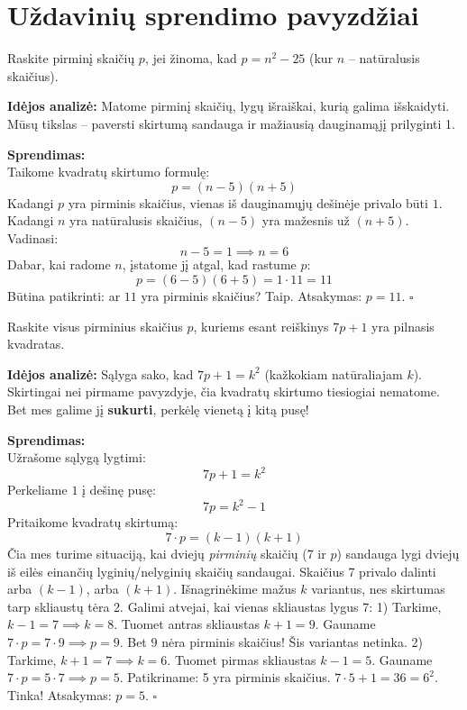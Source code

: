 \documentclass[11pt,a4paper]{scrartcl}
\newenvironment{solution}
    {\begin{list}{}{\setlength{\leftmargin}{10pt}\setlength{\rightmargin}{10pt}}\item[]}
    {\end{list}}
\begin{document}
\section{Uždavinių sprendimo pavyzdžiai}

\begin{example}
Raskite pirminį skaičių $p$, jei žinoma, kad $p = n^2 - 25$ (kur $n$ – natūralusis skaičius).
\end{example}
\begin{solution}
\textbf{Idėjos analizė:} Matome pirminį skaičių, lygų išraiškai, kurią galima išskaidyti. Mūsų tikslas – paversti skirtumą sandauga ir mažiausią dauginamąjį prilyginti 1.

\textbf{Sprendimas:}\\
Taikome kvadratų skirtumo formulę:
$$ p = (n - 5)(n + 5) $$
Kadangi $p$ yra pirminis skaičius, vienas iš dauginamųjų dešinėje privalo būti $1$. Kadangi $n$ yra natūralusis skaičius, $(n-5)$ yra mažesnis už $(n+5)$. Vadinasi:
$$ n - 5 = 1 \implies n = 6 $$
Dabar, kai radome $n$, įstatome jį atgal, kad rastume $p$:
$$ p = (6 - 5)(6 + 5) = 1 \cdot 11 = 11 $$
Būtina patikrinti: ar $11$ yra pirminis skaičius? Taip. 
Atsakymas: $p = 11$. \hfill $\square$
\end{solution}

\begin{example}
Raskite visus pirminius skaičius $p$, kuriems esant reiškinys $7p + 1$ yra pilnasis kvadratas.
\end{example}
\begin{solution}
\textbf{Idėjos analizė:} Sąlyga sako, kad $7p + 1 = k^2$ (kažkokiam natūraliajam $k$). Skirtingai nei pirmame pavyzdyje, čia kvadratų skirtumo tiesiogiai nematome. Bet mes galime jį \textbf{sukurti}, perkėlę vienetą į kitą pusę!

\textbf{Sprendimas:}\\
Užrašome sąlygą lygtimi:
$$ 7p + 1 = k^2 $$
Perkeliame $1$ į dešinę pusę:
$$ 7p = k^2 - 1 $$
Pritaikome kvadratų skirtumą:
$$ 7 \cdot p = (k - 1)(k + 1) $$
Čia mes turime situaciją, kai dviejų \textit{pirminių} skaičių (7 ir $p$) sandauga lygi dviejų iš eilės einančių lyginių/nelyginių skaičių sandaugai. Skaičius 7 privalo dalinti arba $(k-1)$, arba $(k+1)$.
Išnagrinėkime mažus $k$ variantus, nes skirtumas tarp skliaustų tėra 2.
Galimi atvejai, kai vienas skliaustas lygus 7:
1) Tarkime, $k - 1 = 7 \implies k = 8$. Tuomet antras skliaustas $k+1 = 9$. 
Gauname $7 \cdot p = 7 \cdot 9 \implies p = 9$. Bet $9$ nėra pirminis skaičius! Šis variantas netinka.
2) Tarkime, $k + 1 = 7 \implies k = 6$. Tuomet pirmas skliaustas $k-1 = 5$.
Gauname $7 \cdot p = 5 \cdot 7 \implies p = 5$. Patikriname: 5 yra pirminis skaičius. $7 \cdot 5 + 1 = 36 = 6^2$. Tinka!
Atsakymas: $p = 5$. \hfill $\square$
\end{solution}
\end{document}
